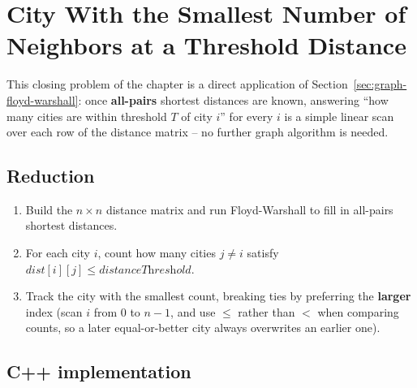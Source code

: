 \section{City With the Smallest Number of Neighbors at a Threshold Distance}
\label{sec:graph-city-smallest-neighbors}


\begin{patternbox}
This closing problem of the chapter is a direct application of
Section~\ref{sec:graph-floyd-warshall}: once \textbf{all-pairs}
shortest distances are known, answering ``how many cities are within
threshold $T$ of city $i$'' for every $i$ is a simple linear scan over
each row of the distance matrix -- no further graph algorithm is
needed.
\end{patternbox}

\subsection*{Reduction}

\begin{enumerate}
  \item Build the $n \times n$ distance matrix and run Floyd-Warshall
        to fill in all-pairs shortest distances.
  \item For each city $i$, count how many cities $j \neq i$ satisfy
        $\textit{dist}[i][j] \le \textit{distanceThreshold}$.
  \item Track the city with the smallest count, breaking ties by
        preferring the \textbf{larger} index (scan $i$ from $0$ to
        $n{-}1$, and use $\le$ rather than $<$ when comparing counts,
        so a later equal-or-better city always overwrites an earlier
        one).
\end{enumerate}

\subsection*{C++ implementation}

